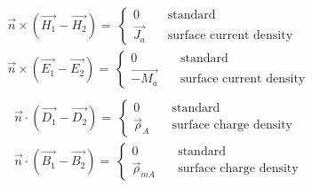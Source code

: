 \begin{itemize}
\begin{minipage}{.25\paperheight}
        \end{minipage}
        \begin{align*}
            &\vec{n} \times \left(\vec{H_1} - \vec{H_2}\right) =\
            \begin{cases} 0 & \quad \text{standard}\\ \vec{J_a} & \quad \text{surface current density} \end{cases}\\
            &\vec{n} \times \left(\vec{E_1} - \vec{E_2}\right) =\
            \begin{cases} 0 & \quad \text{standard}\\ \vec{-M_a} & \quad \text{surface current density} \end{cases}\\
        \end{align*}
        \begin{align*}
            &\vec{n} \cdot \left(\vec{D_1} - \vec{D_2}\right) =\
            \begin{cases} 0 & \quad \text{standard}\\ \vec{\rho}_A & \quad \text{surface charge density} \end{cases}\\
            &\vec{n} \cdot \left(\vec{B_1} - \vec{B_2}\right) =\
            \begin{cases} 0 & \quad \text{standard}\\ \vec{\rho}_{mA} & \quad \text{surface charge density} \end{cases}\\
        \end{align*}
\end{itemize}
